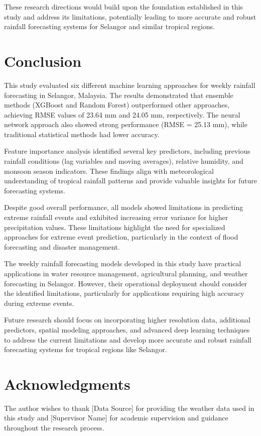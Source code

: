 \documentclass[12pt]{article}
\begin{document}
These research directions would build upon the foundation established in this study and address its limitations, potentially leading to more accurate and robust rainfall forecasting systems for Selangor and similar tropical regions.

\section{Conclusion}
\label{sec:conclusion}

This study evaluated six different machine learning approaches for weekly rainfall forecasting in Selangor, Malaysia. The results demonstrated that ensemble methods (XGBoost and Random Forest) outperformed other approaches, achieving RMSE values of 23.64 mm and 24.05 mm, respectively. The neural network approach also showed strong performance (RMSE = 25.13 mm), while traditional statistical methods had lower accuracy.

Feature importance analysis identified several key predictors, including previous rainfall conditions (lag variables and moving averages), relative humidity, and monsoon season indicators. These findings align with meteorological understanding of tropical rainfall patterns and provide valuable insights for future forecasting systems.

Despite good overall performance, all models showed limitations in predicting extreme rainfall events and exhibited increasing error variance for higher precipitation values. These limitations highlight the need for specialized approaches for extreme event prediction, particularly in the context of flood forecasting and disaster management.

The weekly rainfall forecasting models developed in this study have practical applications in water resource management, agricultural planning, and weather forecasting in Selangor. However, their operational deployment should consider the identified limitations, particularly for applications requiring high accuracy during extreme events.

Future research should focus on incorporating higher resolution data, additional predictors, spatial modeling approaches, and advanced deep learning techniques to address the current limitations and develop more accurate and robust rainfall forecasting systems for tropical regions like Selangor.

\section{Acknowledgments}
\label{sec:acknowledgments}

The author wishes to thank [Data Source] for providing the weather data used in this study and [Supervisor Name] for academic supervision and guidance throughout the research process.
\end{document}
